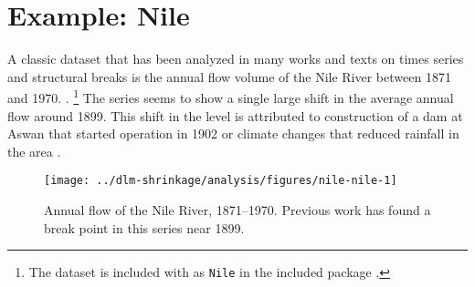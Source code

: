 

\section{Example: Nile}
\label{dlm:sec:nile}

A classic dataset that has been analyzed in many works and texts on times series and structural breaks is the annual flow volume of the Nile River between 1871 and 1970. \parencites{Cobb1978}{Balke1993}{DeJongPenzer1998}{}{DurbinKoopman2012}{CommandeurKoopmanOoms2011}.%
\footnote{The dataset is included with \RLang{} as \texttt{Nile} in the included package .}
The series seems to show a single large shift in the average annual flow around 1899.
This shift in the level is attributed to construction of a dam at Aswan that started operation in 1902 or climate changes that reduced rainfall in the area \parencite[278]{Cobb1978}.

\begin{figure}
  \centering
  \texttt{[image: ../dlm-shrinkage/analysis/figures/nile-nile-1]}
  \caption{Annual flow of the Nile River, 1871--1970. Previous work has found a break point in this series near 1899.}
  \label{dlm:fig:nile}
\end{figure}


